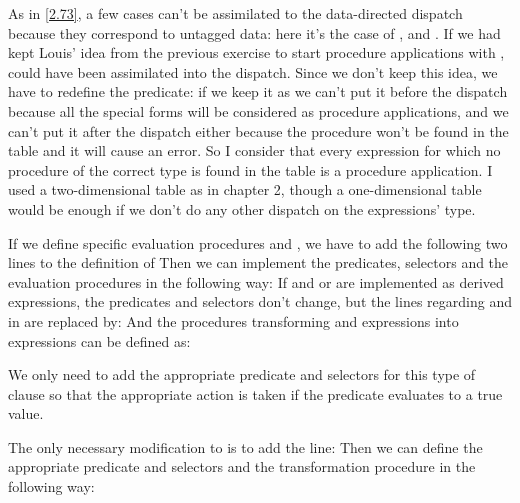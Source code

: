 \begin{exe}[4.3]
    As in \autoref{2.73}, a few cases can’t be assimilated to the data-directed 
    dispatch because they correspond to untagged data: here it’s the case of 
    ,  and . If we had 
    kept Louis’ idea from the previous exercise to start procedure applications 
    with ,  could have been assimilated into the 
    dispatch. Since we don’t keep this idea, we have to redefine the 
     predicate: if we keep it as  we can’t put it 
    before the dispatch because all the special forms will be considered as 
    procedure applications, and we can’t put it after the dispatch either 
    because the procedure won’t be found in the table and it will cause an 
    error. So I consider that every expression for which no procedure of the 
    correct type is found in the table is a procedure application. I used 
    a two-dimensional table as in chapter 2, though a one-dimensional table 
    would be enough if we don’t do any other dispatch on the expressions’ type.
\end{exe}

\begin{exe}[4.4]
    \label{4.4}
    If we define specific evaluation procedures  and 
    , we have to add the following two lines to the definition of 
    Then we can implement the predicates, selectors and the evaluation 
    procedures in the following way:
    If  and {or} are implemented as derived expressions, the 
    predicates and selectors don’t change, but the lines regarding  
    and  in  are replaced by:
    And the procedures transforming  and  expressions into 
     expressions can be defined as:
\end{exe}

\begin{exe}[4.5]
    \label{4.5}
    We only need to add the appropriate predicate and selectors for this type of 
    clause so that the appropriate action is taken if the predicate evaluates to 
    a true value.
\end{exe}

\begin{exe}[4.6]
    \label{4.6}
    The only necessary modification to  is to add the line:
    Then we can define the appropriate predicate and selectors and the 
    transformation procedure  in the following way:
\end{exe}

